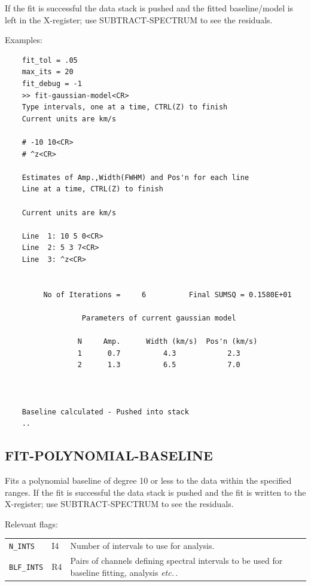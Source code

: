\documentclass[11pt,twoside]{report}
\newcommand{\etc}{{\it etc.\,}}
\begin{document}
If the fit is successful the data stack is pushed and the fitted baseline/model
is left in the X-register; use SUBTRACT-SPECTRUM to see the residuals.

Examples:
\begin{verbatim}
    fit_tol = .05
    max_its = 20
    fit_debug = -1
    >> fit-gaussian-model<CR>
    Type intervals, one at a time, CTRL(Z) to finish
    Current units are km/s  

    # -10 10<CR>
    # ^z<CR>

    Estimates of Amp.,Width(FWHM) and Pos'n for each line
    Line at a time, CTRL(Z) to finish

    Current units are km/s  

    Line  1: 10 5 0<CR>
    Line  2: 5 3 7<CR>
    Line  3: ^z<CR>


         No of Iterations =     6          Final SUMSQ = 0.1580E+01

                  Parameters of current gaussian model

                 N     Amp.      Width (km/s)  Pos'n (km/s)
                 1      0.7          4.3            2.3
                 2      1.3          6.5            7.0



    Baseline calculated - Pushed into stack
    ..
\end{verbatim}

\subsection{FIT-POLYNOMIAL-BASELINE} 

Fits a polynomial baseline of degree 10 or less to the data within the
specified ranges. If the fit is successful the data stack is pushed and
the fit is written to the X-register; use SUBTRACT-SPECTRUM to see the
residuals.

Relevant flags:\\
\begin{tabular}{lll}
  \verb+N_INTS+     & I4 & Number of intervals to use for analysis.\\
  \verb+BLF_INTS+   & R4 & \parbox[t]{4in}
                           {Pairs of channels defining spectral intervals to 
                            be used for baseline fitting, analysis \etc.}
\end{tabular}
\end{document}
